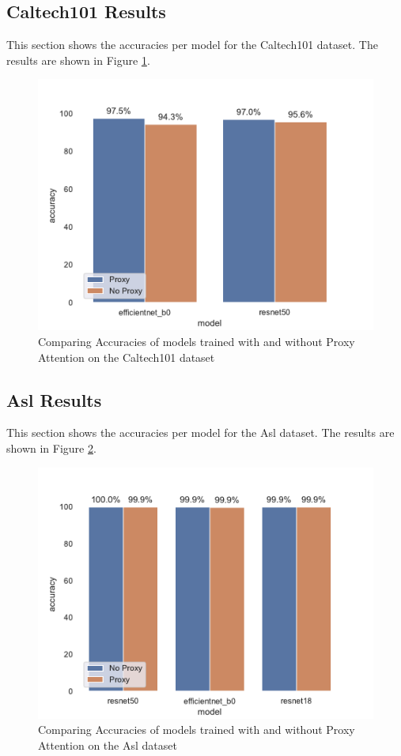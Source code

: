 \subsection{Caltech101 Results}
This section shows the accuracies per model for the Caltech101 dataset. The results are shown in Figure \ref{fig:caltech101_results}. 
\begin{figure}[H]
    \centering
    \includegraphics[width=1\textwidth]{results/caltech101_results.pdf}
    \caption{Comparing Accuracies of models trained with and without Proxy Attention on the Caltech101 dataset}
    \label{fig:caltech101_results}
\end{figure}

\subsection{Asl Results}
This section shows the accuracies per model for the Asl dataset. The results are shown in Figure \ref{fig:asl_results}. 
\begin{figure}[H]
    \centering
    \includegraphics[width=1\textwidth]{results/asl_results.pdf}
    \caption{Comparing Accuracies of models trained with and without Proxy Attention on the Asl dataset}
    \label{fig:asl_results}
\end{figure}


